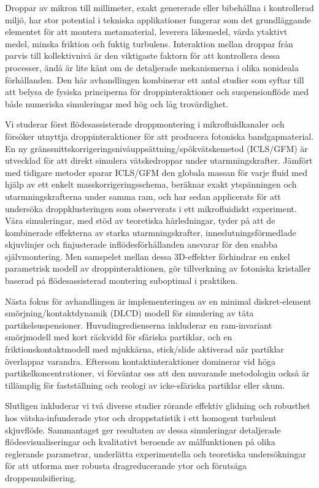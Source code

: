 \begin{abstrakt}
Droppar av mikron till millimeter, exakt genererade eller bibehållna i kontrollerad miljö, har stor potential i tekniska applikationer
fungerar som det grundläggande elementet för att montera metamaterial, leverera läkemedel, värda ytaktivt medel, minska friktion och fuktig turbulens.
Interaktion mellan droppar från parvis till kollektivnivå är den viktigaste faktorn för att kontrollera dessa processer,
ändå är lite känt om de detaljerade mekanismerna i olika nonideala förhållanden.
Den här avhandlingen kombinerar ett antal studier som syftar till att belysa de fysiska principerna för droppinteraktioner och suspensionflöde
med både numeriska simuleringar med hög och låg trovärdighet.

Vi studerar först flödesassisterade droppmontering i mikrofluidkanaler och försöker utnyttja droppinteraktioner för att producera fotoniska bandgapmaterial.
En ny gränssnittskorrigeringsnivåuppsättning/spökvätskemetod (ICLS/GFM) är utvecklad för att direkt simulera vätskedroppar under utarmningskrafter.
Jämfört med tidigare metoder sparar ICLS/GFM den globala massan för varje fluid med hjälp av ett enkelt masskorrigeringsschema,
beräknar exakt ytspänningen och utarmningskrafterna under samma ram,
och har sedan applicerats för att undersöka droppklusteringen som observerats i ett mikrofluidiskt experiment.
Våra simuleringar, med stöd av teoretiska härledningar, tyder på att de kombinerade effekterna av
starka utarmningskrafter, inneslutningsförmedlade skjuvlinjer och finjusterade inflödesförhållanden
ansvarar för den snabba självmontering.
Men samspelet mellan dessa 3D-effekter förhindrar en enkel parametrisk modell av droppinteraktionen,
gör tillverkning av fotoniska kristaller baserad på flödesassisterad montering suboptimal i praktiken.

Nästa fokus för avhandlingen är implementeringen av en minimal diskret-element smörjning/kontaktdynamik (DLCD) modell för simulering av täta partikelsuspensioner.
Huvudingredienserna inkluderar en ram-invariant smörjmodell med kort räckvidd för sfäriska partiklar,
och en friktionskontaktmodell med mjukkärna, stick/slide aktiverad när partiklar överlappar varandra.
Eftersom kontaktinteraktioner dominerar vid höga partikelkoncentrationer,
vi förväntar oss att den nuvarande metodologin också är tillämplig för fastställning och reologi av icke-sfäriska partiklar eller skum.

Slutligen inkluderar vi två diverse studier rörande
effektiv glidning och robusthet hos vätska-infunderade ytor och droppstatistik i ett homogent turbulent skjuvflöde.
Sammantaget ger resultaten av dessa simuleringar detaljerade flödesvisualiseringar och kvalitativt beroende av målfunktionen på olika reglerande parametrar,
underlätta experimentella och teoretiska undersökningar för att utforma mer robusta dragreducerande ytor och förutsäga droppemulsifiering.

%
%
\end{abstrakt}


